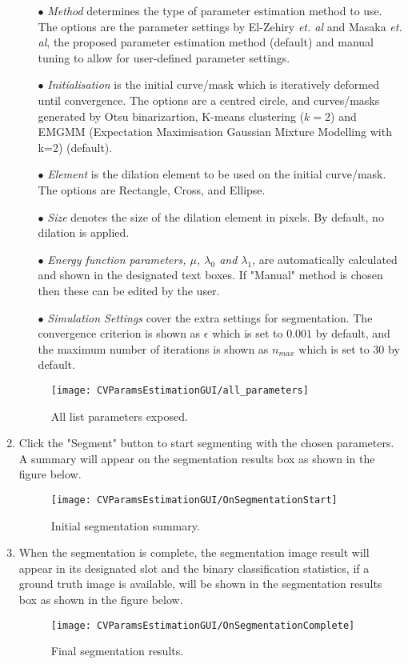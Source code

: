 \documentclass[
11pt, %
a4paper, %
oneside, %
headinclude,footinclude, %
BCOR5mm, %
]{scrartcl}
\begin{document}
\begin{enumerate}
\begin{enumerate}
	\item[$\bullet$]
	\textit{Method} determines the type of parameter estimation method to use. The options are the parameter settings by El-Zehiry \textit{et. al} and Masaka \textit{et. al}, the proposed parameter estimation method (default) and manual tuning to allow for user-defined parameter settings.
	
	\item[$\bullet$]
	\textit{Initialisation} is the initial curve/mask which is iteratively deformed until convergence. The options are a centred circle, and curves/masks generated by Otsu binarizartion, K-means clustering ($k=2$) and EMGMM (Expectation Maximisation Gaussian Mixture Modelling with k=2) (default).
	
	\item[$\bullet$]
	\textit{Element} is the dilation element to be used on the initial curve/mask. The options are Rectangle, Cross, and Ellipse.
	
	\item[$\bullet$]
	\textit{Size} denotes the size of the dilation element in pixels. By default, no dilation is applied.
	
	\item[$\bullet$]
	\textit{Energy function parameters, $\mu$, $\lambda_0$ and $\lambda_1$}, are automatically calculated and shown in the designated text boxes. If "Manual" method is chosen then these can be edited by the user.
	
	\item[$\bullet$]
	\textit{Simulation Settings} cover the extra settings for segmentation. The convergence criterion is shown as $\epsilon$ which is set to $0.001$ by default, and the maximum number of iterations is shown as $n_{max}$ which is set to $30$ by default.
\end{enumerate}
\begin{figure}[h]
	\centering
	\texttt{[image: CVParamsEstimationGUI/all\_parameters]}
	\caption{All list parameters exposed.}
\end{figure}
\newpage
\item
Click the "Segment" button to start segmenting with the chosen parameters. A summary will appear on the segmentation results box as shown in the figure below.
\begin{figure}[h]
\centering
\texttt{[image: CVParamsEstimationGUI/OnSegmentationStart]}
\caption{Initial segmentation summary.}
\end{figure}

\item
When the segmentation is complete, the segmentation image result will appear in its designated slot and the binary classification statistics, if a ground truth image is available, will be shown in the segmentation results box as shown in the figure below.
\begin{figure}[t]
\centering
\texttt{[image: CVParamsEstimationGUI/OnSegmentationComplete]}
\caption{Final segmentation results.}
\end{figure}
\end{enumerate}
\end{document}
